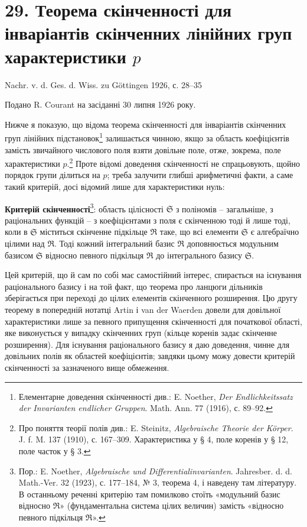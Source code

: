 \documentclass[11pt]{article}
\begin{document}
\section*{29. Теорема скінченності для інваріантів скінченних лінійних груп характеристики $p$}

\begin{center}
Nachr. v. d. Ges. d. Wiss. zu Göttingen 1926, с. 28--35
\end{center}

Подано R. Courant на засіданні 30 липня 1926 року.

Нижче я показую, що відома теорема скінченності для інваріантів скінченних груп лінійних підстановок\footnote{Елементарне доведення скінченності див.: E. Noether, \emph{Der Endlichkeitssatz der Invarianten endlicher Gruppen}. Math. Ann. 77 (1916), с. 89--92.} залишається чинною, якщо за область коефіцієнтів замість звичайного числового поля взяти довільне поле, отже, зокрема, поле характеристики $p$.\footnote{Про поняття теорії полів див.: E. Steinitz, \emph{Algebraische Theorie der Körper}. J. f. M. 137 (1910), с. 167--309. Характеристика у § 4, поле коренів у § 12, поле часток у § 3.} Проте відомі доведення скінченності не спрацьовують, щойно порядок групи ділиться на $p$; треба залучити глибші арифметичні факти, а саме такий критерій, досі відомий лише для характеристики нуль:

\textbf{Критерій скінченності}\footnote{Пор.: E. Noether, \emph{Algebraische und Differentialinvarianten}. Jahresber. d. d. Math.-Ver. 32 (1923), с. 177--184, № 3, теорема 4, і наведену там літературу. В останньому реченні критерію там помилково стоїть «модульний базис відносно $\mathfrak R$» (фундаментальна система цілих величин) замість «відносно певного підкільця $\mathfrak R$».}: область цілісності $\mathfrak S$ з поліномів -- загальніше, з раціональних функцій -- з коефіцієнтами з поля є скінченною тоді й лише тоді, коли в $\mathfrak S$ міститься скінченне підкільце $\mathfrak R$ таке, що всі елементи $\mathfrak S$ є алгебраїчно цілими над $\mathfrak R$. Тоді кожний інтегральний базис $\mathfrak R$ доповнюється модульним базисом $\mathfrak S$ відносно певного підкільця $\mathfrak R$ до інтегрального базису $\mathfrak S$.

Цей критерій, що й сам по собі має самостійний інтерес, спирається на існування раціонального базису і на той факт, що теорема про ланцюги дільників зберігається при переході до цілих елементів скінченного розширення. Цю другу теорему в попередній нотатці Artin і van der Waerden довели для довільної характеристики лише за певного припущення скінченності для початкової області, яке виконується у випадку скінченних груп (кільце коренів задає скінченне розширення). Для існування раціонального базису я даю доведення, чинне для довільних полів як областей коефіцієнтів; завдяки цьому можу довести критерій скінченності за зазначеного вище обмеження.
\end{document}
